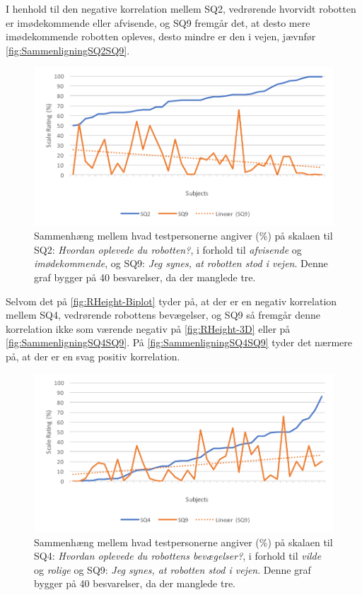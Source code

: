 \noindent
%
I henhold til den negative korrelation mellem SQ2, vedrørende hvorvidt robotten er imødekommende eller afvisende, og SQ9 fremgår det, at desto mere imødekommende robotten opleves, desto mindre er den i vejen, jævnfør \autoref{fig:SammenligningSQ2SQ9}.
%
\begin{figure}[H]
	\centering
	\includegraphics[width=\textwidth]{Figure/Korrelationsgrafer/SQ2+SQ9}
	\caption{Sammenhæng mellem hvad testpersonerne angiver (\%) på skalaen til SQ2: \textit{Hvordan oplevede du robotten?}, i forhold til \textit{afvisende} og \textit{imødekommende}, og SQ9: \textit{Jeg synes, at robotten stod i vejen}. Denne graf bygger på 40 besvarelser, da der manglede tre.}
	\label{fig:SammenligningSQ2SQ9}
\end{figure}
\noindent
%
Selvom det på \autoref{fig:RHeight-Biplot} tyder på, at der er en negativ korrelation mellem SQ4, vedrørende robottens bevægelser, og SQ9 så fremgår denne korrelation ikke som værende negativ på \autoref{fig:RHeight-3D} eller på \autoref{fig:SammenligningSQ4SQ9}. På \autoref{fig:SammenligningSQ4SQ9} tyder det nærmere på, at der er en svag positiv korrelation. 
%
\begin{figure}[H]
	\centering
	\includegraphics[width=\textwidth]{Figure/Korrelationsgrafer/SQ4+SQ9}
	\caption{Sammenhæng mellem hvad testpersonerne angiver (\%) på skalaen til SQ4: \textit{Hvordan oplevede du robottens bevægelser?}, i forhold til \textit{vilde} og \textit{rolige} og SQ9: \textit{Jeg synes, at robotten stod i vejen}. Denne graf bygger på 40 besvarelser, da der manglede tre.}
	\label{fig:SammenligningSQ4SQ9}
\end{figure}
